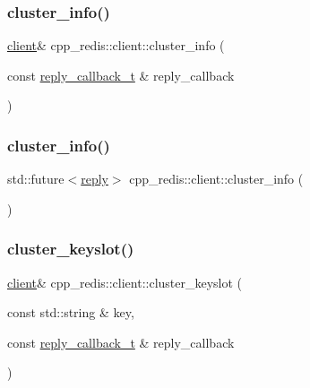 \mbox{\label{classcpp__redis_1_1client_a831d52a9dc9115e817bae15db0fb18a6}} 
\subsubsection{\texorpdfstring{cluster\+\_\+info()}{cluster\_info()}\hspace{0.1cm}{\footnotesize\ttfamily [1/2]}}
{\footnotesize\ttfamily \hyperlink{classcpp__redis_1_1client}{client}\& cpp\+\_\+redis\+::client\+::cluster\+\_\+info (\begin{DoxyParamCaption}\item[{const \hyperlink{classcpp__redis_1_1client_a061a1140d36d2eaeda82b09a0bb3f9f2}{reply\+\_\+callback\+\_\+t} \&}]{reply\+\_\+callback }\end{DoxyParamCaption})}

\mbox{\label{classcpp__redis_1_1client_a993170e08c425a810fa757bd4c202d10}} 
\subsubsection{\texorpdfstring{cluster\+\_\+info()}{cluster\_info()}\hspace{0.1cm}{\footnotesize\ttfamily [2/2]}}
{\footnotesize\ttfamily std\+::future$<$\hyperlink{classcpp__redis_1_1reply}{reply}$>$ cpp\+\_\+redis\+::client\+::cluster\+\_\+info (\begin{DoxyParamCaption}{ }\end{DoxyParamCaption})}

\mbox{\label{classcpp__redis_1_1client_ae0314fc2697674f4be4fca1cc5cbd4a1}} 
\subsubsection{\texorpdfstring{cluster\+\_\+keyslot()}{cluster\_keyslot()}\hspace{0.1cm}{\footnotesize\ttfamily [1/2]}}
{\footnotesize\ttfamily \hyperlink{classcpp__redis_1_1client}{client}\& cpp\+\_\+redis\+::client\+::cluster\+\_\+keyslot (\begin{DoxyParamCaption}\item[{const std\+::string \&}]{key,  }\item[{const \hyperlink{classcpp__redis_1_1client_a061a1140d36d2eaeda82b09a0bb3f9f2}{reply\+\_\+callback\+\_\+t} \&}]{reply\+\_\+callback }\end{DoxyParamCaption})}

